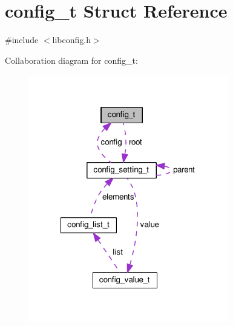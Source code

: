 \hypertarget{structconfig__t}{\section{config\-\_\-t Struct Reference}
\label{structconfig__t}
}


{\ttfamily \#include $<$libconfig.\-h$>$}



Collaboration diagram for config\-\_\-t\-:\nopagebreak
\begin{figure}[H]
\begin{center}
\leavevmode
\includegraphics[width=247pt]{structconfig__t__coll__graph}
\end{center}
\end{figure}
